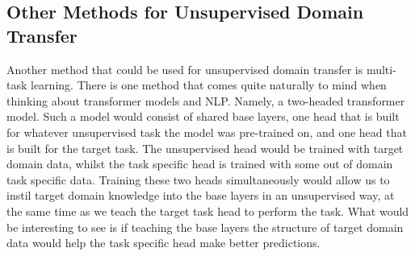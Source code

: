\documentclass[twoside,twocolumn]{article}
\begin{document}
\subsection{Other Methods for Unsupervised Domain Transfer}
Another method that could be used for unsupervised domain transfer is multi-task
learning. There is one method that comes quite naturally to mind when thinking
about transformer models and NLP. Namely, a two-headed transformer model.  Such
a model would consist of shared base layers, one head that is built for whatever
unsupervised task the model was pre-trained on, and one head that is built for
the target task.  The unsupervised head would be trained with target domain
data, whilst the task specific head is trained with some out of domain task
specific data. Training these two heads simultaneously would allow us to instil
target domain knowledge into the base layers in an unsupervised way, at the same
time as we teach the target task head to perform the task. What would be
interesting to see is if teaching the base layers the structure of target domain
data would help the task specific head make better predictions.

\printbibliography
\end{document}
